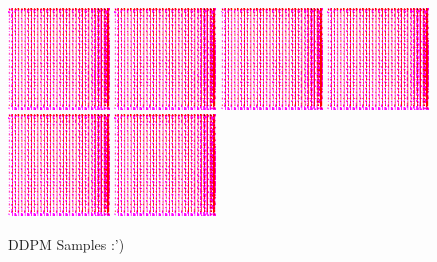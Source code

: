 \documentclass[11pt]{article}
\numberwithin{equation}{section}
\begin{document}
\newpage
\begin{figure}[h]
	\caption{DDPM Samples :')}
	\label{fig:ddpmsamples}
	\centering
	\includegraphics[width=0.24\textwidth]{LatentDiffusion/diffusion-samples/ddpm32/sample_1.png}%
	\hfill
	\includegraphics[width=0.24\textwidth]{LatentDiffusion/diffusion-samples/ddpm32/sample_2.png}%
	\hfill
	\includegraphics[width=0.24\textwidth]{LatentDiffusion/diffusion-samples/ddpm32/sample_3.png}
	\hfill
	\includegraphics[width=0.24\textwidth]{LatentDiffusion/diffusion-samples/ddpm32/sample_4.png}%
	\hfill
	\includegraphics[width=0.24\textwidth]{LatentDiffusion/diffusion-samples/ddpm32/sample_5.png}%
	\hfill
	\includegraphics[width=0.24\textwidth]{LatentDiffusion/diffusion-samples/ddpm32/sample_6.png}%

\end{figure}
\end{document}

